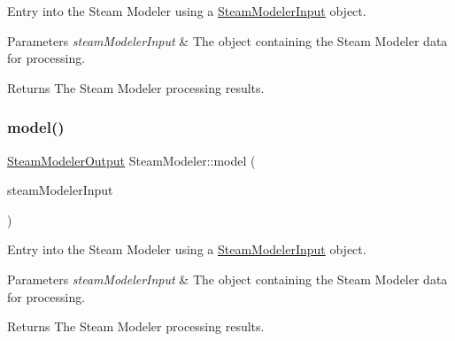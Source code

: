Entry into the Steam Modeler using a \hyperlink{class_steam_modeler_input}{Steam\+Modeler\+Input} object. 
\begin{DoxyParams}{Parameters}
{\em steam\+Modeler\+Input} & The object containing the Steam Modeler data for processing. \\
\hline
\end{DoxyParams}
\begin{DoxyReturn}{Returns}
The Steam Modeler processing results. 
\end{DoxyReturn}
\mbox{\label{class_steam_modeler_a2d0d297d49be3c9cf856253df508edcb}} 
\subsubsection{\texorpdfstring{model()}{model()}\hspace{0.1cm}{\footnotesize\ttfamily [3/6]}}
{\footnotesize\ttfamily \hyperlink{class_steam_modeler_output}{Steam\+Modeler\+Output} Steam\+Modeler\+::model (\begin{DoxyParamCaption}\item[{const \hyperlink{class_steam_modeler_input}{Steam\+Modeler\+Input} \&}]{steam\+Modeler\+Input }\end{DoxyParamCaption})}

Entry into the Steam Modeler using a \hyperlink{class_steam_modeler_input}{Steam\+Modeler\+Input} object. 
\begin{DoxyParams}{Parameters}
{\em steam\+Modeler\+Input} & The object containing the Steam Modeler data for processing. \\
\hline
\end{DoxyParams}
\begin{DoxyReturn}{Returns}
The Steam Modeler processing results. 
\end{DoxyReturn}
\mbox{\label{class_steam_modeler_a60b60a05d2527abf22140579b4b669bf}} 

